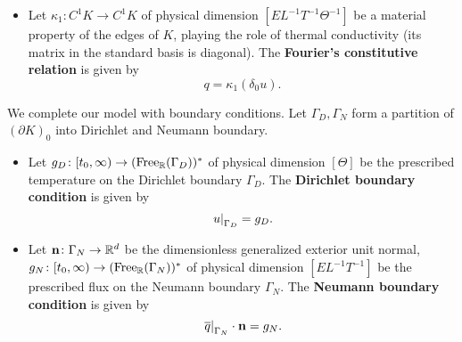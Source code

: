 \begin{discussion}
\begin{itemize}
\begin{equation}
      \end{equation}
    \item
      Let $\kappa_1 \colon C^1 K \to C^1 K$
      of physical dimension $[E L^{-1} T^{-1} \Theta^{-1}]$
      be a material property of the edges of $K$,
      playing the role of thermal conductivity
      (its matrix in the standard basis is diagonal).
      The \textbf{Fourier's constitutive relation} is given by
      \begin{equation}
        q = \kappa_1 (\delta_0 u).
      \end{equation}
  \end{itemize}
  We complete our model with boundary conditions.
  Let $\Gamma_D, \Gamma_N$ form a partition of $(\partial K)_0$
  into Dirichlet and Neumann boundary.
  \begin{itemize}
    \item
      Let $g_D \colon [t_0, \infty) \to ({\rm Free}_{\mathbb{R}}(\Gamma_D))^*$
      of physical dimension $[\Theta]$
      be the prescribed temperature on the Dirichlet boundary $\Gamma_D$.
      The \textbf{Dirichlet boundary condition} is given by
      \begin{equation}
        \left. u \right|_{\Gamma_D} = g_D.
      \end{equation}
    \item
      Let
        ${\bf n} \colon \Gamma_N \to \mathbb{R}^d$
          be the dimensionless generalized exterior unit normal,
        $g_N \colon [t_0, \infty) \to ({\rm Free}_{\mathbb{R}}(\Gamma_N))^*$
          of physical dimension $[E L^{-1} T^{-1}]$
          be the prescribed flux on the Neumann boundary $\Gamma_N$.
      The \textbf{Neumann boundary condition} is given by
      \begin{equation}
        \left. \overline{q} \right|_{\Gamma_N} \cdot {\bf n} = g_N.
      \end{equation}
  \end{itemize}
\end{discussion}
